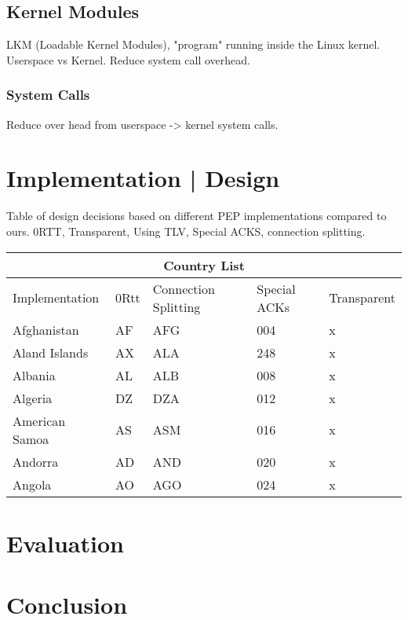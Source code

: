 \documentclass[a4paper,english, 11pt]{report}
\begin{document}
\section{Kernel Modules}
LKM (Loadable Kernel Modules), "program" running inside the Linux kernel.
Userspace vs Kernel. Reduce system call overhead.
\subsection{System Calls}
Reduce over head from userspace -> kernel system calls.

\chapter{Implementation | Design}

{Table of design decisions based on different PEP implementations compared to ours.}
{0RTT, Transparent, Using TLV, Special ACKS, connection splitting.}\\
\begin{tabular}{ |p{4cm}||p{2cm}|p{2cm}|p{2cm}|p{2cm}| }
 \hline
 \multicolumn{5}{|c|}{Country List} \\
 \hline
 Implementation& 0Rtt &Connection Splitting &Special ACKs &Transparent\\
 \hline
 Afghanistan   & AF    &AFG&   004 & x\\
 Aland Islands&   AX  & ALA   &248 & x\\
 Albania &AL & ALB&  008 & x\\
 Algeria    &DZ & DZA&  012& x \\
 American Samoa&   AS  & ASM&016& x\\
 Andorra& AD  & AND   &020& x\\
 Angola& AO  & AGO&024& x\\
 \hline
\end{tabular}

\chapter{Evaluation}
\chapter{Conclusion}

{}

\end{document}
